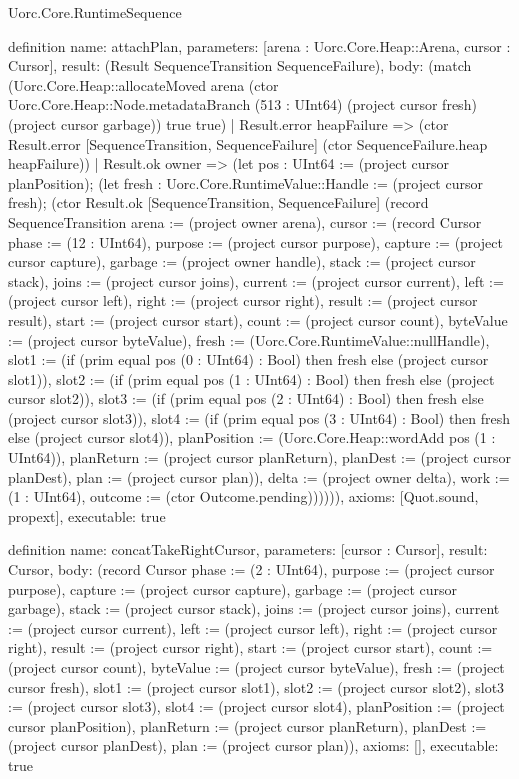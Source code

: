 \begin{lexlean}{Uorc.Core.RuntimeSequence}
\begin{semanticmodule}
definition{
  name: attachPlan,
  parameters: [arena : Uorc.Core.Heap::Arena, cursor : Cursor],
  result: (Result SequenceTransition SequenceFailure),
  body: (match (Uorc.Core.Heap::allocateMoved arena (ctor Uorc.Core.Heap::Node.metadataBranch (513 : UInt64) (project cursor fresh) (project cursor garbage)) true true)
    | Result.error heapFailure => (ctor Result.error [SequenceTransition, SequenceFailure] (ctor SequenceFailure.heap heapFailure))
    | Result.ok owner => (let pos : UInt64 := (project cursor planPosition); (let fresh : Uorc.Core.RuntimeValue::Handle := (project cursor fresh); (ctor Result.ok [SequenceTransition, SequenceFailure] (record SequenceTransition {arena := (project owner arena), cursor := (record Cursor {phase := (12 : UInt64), purpose := (project cursor purpose), capture := (project cursor capture), garbage := (project owner handle), stack := (project cursor stack), joins := (project cursor joins), current := (project cursor current), left := (project cursor left), right := (project cursor right), result := (project cursor result), start := (project cursor start), count := (project cursor count), byteValue := (project cursor byteValue), fresh := (Uorc.Core.RuntimeValue::nullHandle), slot1 := (if (prim equal pos (0 : UInt64) : Bool) then fresh else (project cursor slot1)), slot2 := (if (prim equal pos (1 : UInt64) : Bool) then fresh else (project cursor slot2)), slot3 := (if (prim equal pos (2 : UInt64) : Bool) then fresh else (project cursor slot3)), slot4 := (if (prim equal pos (3 : UInt64) : Bool) then fresh else (project cursor slot4)), planPosition := (Uorc.Core.Heap::wordAdd pos (1 : UInt64)), planReturn := (project cursor planReturn), planDest := (project cursor planDest), plan := (project cursor plan)}), delta := (project owner delta), work := (1 : UInt64), outcome := (ctor Outcome.pending)}))))),
  axioms: [Quot.sound, propext],
  executable: true
}

definition{
  name: concatTakeRightCursor,
  parameters: [cursor : Cursor],
  result: Cursor,
  body: (record Cursor {phase := (2 : UInt64), purpose := (project cursor purpose), capture := (project cursor capture), garbage := (project cursor garbage), stack := (project cursor stack), joins := (project cursor joins), current := (project cursor current), left := (project cursor left), right := (project cursor right), result := (project cursor right), start := (project cursor start), count := (project cursor count), byteValue := (project cursor byteValue), fresh := (project cursor fresh), slot1 := (project cursor slot1), slot2 := (project cursor slot2), slot3 := (project cursor slot3), slot4 := (project cursor slot4), planPosition := (project cursor planPosition), planReturn := (project cursor planReturn), planDest := (project cursor planDest), plan := (project cursor plan)}),
  axioms: [],
  executable: true
}


\end{semanticmodule}
\end{lexlean}
